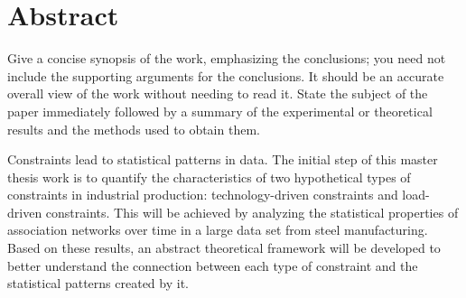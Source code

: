\chapter*{Abstract}

{\color{red} 
	
	Give a concise synopsis of the work, emphasizing the conclusions; you need not include the	supporting arguments for the conclusions. It should be an
	accurate overall view of the work without needing to read it. State the subject of the paper immediately followed by a summary of the experimental or theoretical results and the methods used to obtain them.
	
	Constraints lead to statistical patterns in data. The initial step of this master thesis work is to quantify the characteristics of two hypothetical types of constraints in industrial production: technology-driven constraints and load-driven constraints. This will be achieved by analyzing the statistical properties of association networks over time in a large data set from steel manufacturing. Based on these results, an abstract theoretical framework will be developed to better understand the connection between each type of constraint and the statistical patterns created by it.

}
